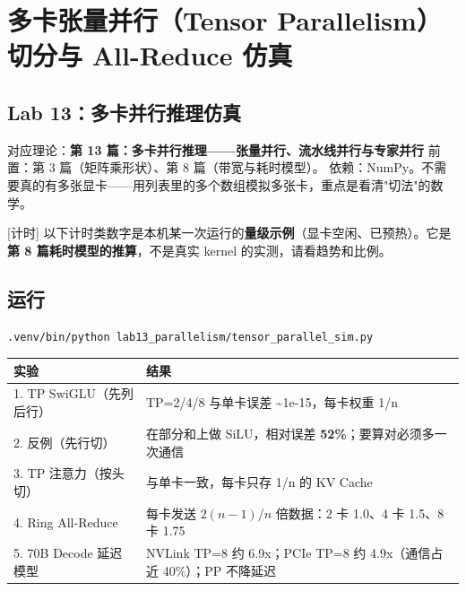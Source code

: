 \chapter{多卡张量并行（Tensor Parallelism）切分与 All-Reduce 仿真}

\section{Lab 13：多卡并行推理仿真}

\begin{noteBox}[核心导读与背景]
对应理论：\textbf{第 13 篇：多卡并行推理——张量并行、流水线并行与专家并行}
前置：第 3 篇（矩阵乘形状）、第 8 篇（带宽与耗时模型）。
依赖：NumPy。不需要真的有多张显卡——用列表里的多个数组模拟多张卡，重点是看清"切法"的数学。
\end{noteBox}

\begin{noteBox}[核心导读与背景]
{}[计时] 以下计时类数字是本机某一次运行的\textbf{量级示例}（显卡空闲、已预热）。它是\textbf{第 8 篇耗时模型的推算}，不是真实 kernel 的实测，请看趋势和比例。
\end{noteBox}

\section{运行}

\begin{lstlisting}[language=bash]
.venv/bin/python lab13_parallelism/tensor_parallel_sim.py
\end{lstlisting}

\begin{center}
\small
\begin{tabularx}{\textwidth}{p{3.5cm} X}
\toprule
\textbf{实验} & \textbf{结果} \\
\midrule
1. TP SwiGLU（先列后行） & TP=2/4/8 与单卡误差 \textasciitilde{}1e-15，每卡权重 1/n \\
2. 反例（先行切） & 在部分和上做 SiLU，相对误差 \textbf{52\%}；要算对必须多一次通信 \\
3. TP 注意力（按头切） & 与单卡一致，每卡只存 1/n 的 KV Cache \\
4. Ring All-Reduce & 每卡发送 $2(n-1)/n$ 倍数据：2 卡 1.0、4 卡 1.5、8 卡 1.75 \\
5. 70B Decode 延迟模型 & NVLink TP=8 约 6.9x；PCIe TP=8 约 4.9x（通信占近 40\%）；PP 不降延迟 \\
\bottomrule
\end{tabularx}
\end{center}

